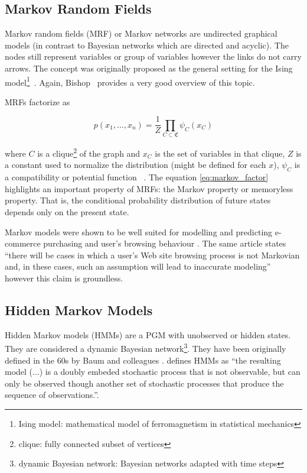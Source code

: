 \subsection{Markov Random Fields}

Markov random fields (MRF) or Markov networks are undirected graphical models 
\cite{Kindermann1980} (in contrast to Bayesian networks which are directed and 
acyclic). The nodes still represent variables or group of variables however the 
links do not carry arrows. The concept was originally proposed as the general 
setting for the Ising model\footnote{Ising model: mathematical model of 
    ferromagnetism in statistical mechanics}~\cite{Kindermann1980}. Again, 
Bishop~\cite{bishop2006pattern} provides a very good overview of this topic. 

MRFs factorize as

\begin{equation}
p(x_{1}, ..., x_{n}) = \frac{1}{Z} \prod_{C \subset \mathfrak{C}}^{} 
\psi_{C}(x_{C}) \label{eq:markov_factor}
\end{equation}

where $ C $ is a clique\footnote{clique: fully connected subset of vertices} of 
the graph and $ x_{C} $ is the set of variables in that clique, $ Z $ is a 
constant used to normalize the distribution (might be defined for each $ x $), 
$ \psi_{C} $ is a compatibility or potential function~\cite[section 
2.1.2]{Wainwright2008} \cite[section 8.3]{bishop2006pattern}. The equation 
\ref{eq:markov_factor} highlights an important property of MRFs: the Markov 
property or memoryless property. That is, the conditional probability 
distribution of future states depends only on the present state. 

Markov models were shown to be well suited for modelling and predicting 
e-commerce purchasing and user's browsing behaviour \cite{Deshpande2001}. The 
same article states ``there will be cases in which a user’s Web site
browsing process is not Markovian and, in these cases, such an assumption will
lead to inaccurate modeling'' however this claim is groundless.

\subsection{Hidden Markov Models}

Hidden Markov models (HMMs) are a PGM with unobserved or hidden states. They 
are considered a dynamic Bayesian network\footnote{dynamic Bayesian network: 
    Bayesian networks adapted with time steps}. They have been originally 
    defined 
in the 60s by Baum and colleagues \cite{Baum1966}. \cite{Rabiner1989} defines 
HMMs as ``the resulting model (...) is a doubly embeded stochastic process that 
is not observable, but can only be observed though another set of stochastic 
processes that produce the sequence of observations.''.

